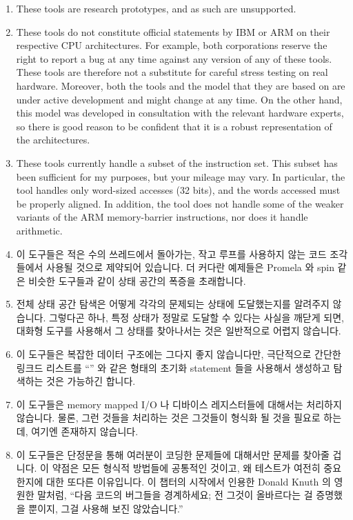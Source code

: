 \begin{enumerate}
\item	These tools are research prototypes, and as such are unsupported.
\item	These tools do not constitute official statements by IBM or ARM
	on their respective CPU architectures. For example, both
	corporations reserve the right to report a bug at any time against
	any version of any of these tools. These tools are therefore not a
	substitute for careful stress testing on real hardware. Moreover,
	both the tools and the model that they are based on are under
	active development and might change at any time. On the other
	hand, this model was developed in consultation with the relevant
	hardware experts, so there is good reason to be confident that
	it is a robust representation of the architectures.
\item	These tools currently handle a subset of the instruction set.
	This subset has been sufficient for my purposes, but your mileage
	may vary. In particular, the tool handles only word-sized accesses
	(32 bits), and the words accessed must be properly aligned. In
	addition, the tool does not handle some of the weaker variants
	of the ARM memory-barrier instructions, nor does it handle arithmetic.
\fi
\item	이 도구들은 적은 수의 쓰레드에서 돌아가는, 작고 루프를 사용하지 않는
	코드 조각들에서 사용될 것으로 제약되어 있습니다.
	더 커다란 예제들은 Promela 와 spin 같은 비슷한 도구들과 같이 상태
	공간의 폭증을 초래합니다.
\item	전체 상태 공간 탐색은 어떻게 각각의 문제되는 상태에 도달했는지를
	알려주지 않습니다.
	그렇다곤 하나, 특정 상태가 정말로 도달할 수 있다는 사실을 깨닫게 되면,
	대화형 도구를 사용해서 그 상태를 찾아나서는 것은 일반적으로 어렵지
	않습니다.
\item	이 도구들은 복잡한 데이터 구조에는 그다지 좋지 않습니다만, 극단적으로
	간단한 링크드 리스트를 ``'' 와 같은 형태의 초기화
	statement 들을 사용해서 생성하고 탐색하는 것은 가능하긴 합니다.
\item	이 도구들은 memory mapped I/O 나 디바이스 레지스터들에 대해서는
	처리하지 않습니다.
	물론, 그런 것들을 처리하는 것은 그것들이 형식화 될 것을 필요로 하는데,
	여기엔 존재하지 않습니다.
\item	이 도구들은 단정문을 통해 여러분이 코딩한 문제들에 대해서만 문제를
	찾아줄 겁니다.
	이 약점은 모든 형식적 방법들에 공통적인 것이고, 왜 테스트가 여전히
	중요한지에 대한 또다른 이유입니다.
	이 챕터의 시작에서 인용한 Donald Knuth 의 영원한 말처럼, ``다음 코드의
	버그들을 경계하세요; 전 그것이 올바르다는 걸 증명했을 뿐이지, 그걸
	사용해 보진 않았습니다.''
\iffalse


\end{enumerate}
